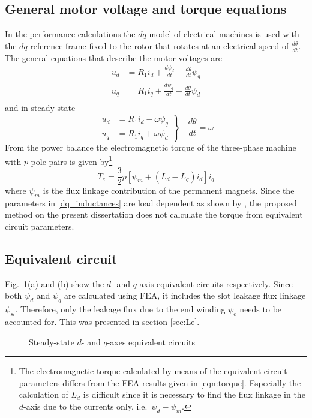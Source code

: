 \subsection{General motor voltage and torque equations}
In the performance calculations the $dq$-model of electrical machines is used with the $dq$-reference frame fixed to the rotor that rotates at an electrical speed of $\frac{d\theta}{dt}$. The general equations that describe the motor voltages are  
\begin{equation}\label{eqn_ud_2}
  \begin{aligned}
	u_d &= R_{1}i_{d} + \frac{d\psi_{d}}{dt} - \frac{d\theta}{dt} \psi_{q}\\
	u_q &= R_{1}i_{q} + \frac{d\psi_{q}}{dt} + \frac{d\theta}{dt} \psi_{d}\\
	\end{aligned}
\end{equation}
and in steady-state
\begin{equation}\label{eqn_ud_3}
  \left.
  \begin{aligned}
	  u_d &= R_{1}i_{d} - \omega \psi_{q} \\
	  u_q &= R_{1}i_{q} + \omega \psi_{d} 
	\end{aligned}
	\right\} 
	\quad
	\frac{d\theta}{dt}=\omega
\end{equation}
From the power balance the electromagnetic torque of the three-phase machine with $p$ pole pairs is given by\footnote{The electromagnetic torque calculated by means of the equivalent circuit parameters differs from the FEA results given in \eqref{eqn:torque}. Especially the calculation of $L_d$ is difficult since it is necessary to find the flux linkage in the $d$-axis due to the currents only, i.e.~$\psi_d-\psi_m$.}
\begin{equation}\label{dq_inductances}
	T_e = \frac{3}{2} p \left[ 
	\psi_{m} + \left(L_{d}- L_{q}\right) i_{d}
	\right]i_{q}
\end{equation}
where $\psi_{m}$ is the flux linkage contribution of the permanent magnets. Since the parameters in \eqref{dq_inductances} are load dependent as shown by \cite{reichert_2_2004}, the proposed method on the present dissertation does not calculate the torque from equivalent circuit parameters.

\subsection{Equivalent circuit}\label{subsec:eq_circ}
Fig.~\ref{fig:qd_axis_model}(a) and (b) show the $d$- and $q$-axis equivalent circuits respectively. Since both $\psi_d$ and $\psi_q$ are calculated using FEA, it includes the slot leakage flux linkage $\psi_{sl}$. Therefore, only the leakage flux due to the end winding $\psi_e$ needs to be accounted for. This was presented in section \ref{sec:Le}. 
\begin{figure}[htbp]
	\centering
		
		\caption{Steady-state $d$- and $q$-axes equivalent circuits}
		\label{fig:qd_axis_model}
\end{figure}

